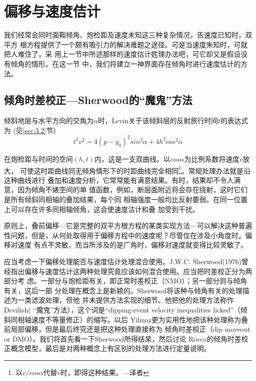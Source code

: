 \section{偏移与速度佶计}
\label{sec:3.6}

我们经常会同时面鞍倾角、炮检距及速度未知这三种复杂情况，告速度已知时，双平方
根方程提供了一个颇有吸引力的解决难题之途径。可是当速度朱知时，可就把人难住了，采
用上一节中所述那样的速度估计姓理办法吧，可它却又是假设没有倾角的情形。在这一节
中，我们将建立一神界面存在倾角时进行速度估计的方法。

\subsection{倾角时差校正---Sherwood的“魔鬼”方法}
\label{sec:3.6.1}

倾斜地层与水平方向的交角为$\alpha$时，Levin关于该倾斜层的反射旅行时间$t$的表达式为
(见\ref{sec:3.2}节）
\begin{equation}
t^2v^2=4(y-y_0)^2sin^2\alpha + 4h^2cos^2\alpha
\label{eq:ex3.6.1}
\end{equation}

在炮检距与时间的空间$(h,t)$内，这是一支双曲线。以$cos\alpha$为比例系数将速度$v$放大，
可使这时距曲线同无倾角情形下的时距曲线完全相同\footnote{
以$v/cos\alpha$代替$v$时，即得这种结果。---译者
}。常规处理办法就是沿这种曲线进行
叠加和速度分析，它常常能有满意结果。有时，结果却不令人满意，因为倾角不婊空间的单
值函数，例如，断层面附近将会存在绕射，这时它们是所有倾斜同相轴的叠加结果，每个同
相轴强度一般均比反射要弱。在同一位置上可以存在许多同相轴倾角，这会使速度沽计和叠
加受到干扰。

原则上，叠前偏移---它是完整的双平方根方程的某类实现方法---可以解决这种普遍
性问题，但是，从何处取得用于偏移方程中的速度呢？尽管仅在涉及小角度时，偏移对速度
有点不灵敏，而当所涉及的是广角时，偏移对速度就变得比较灵敏了。

应当考虑一下偏移处理能否与速度估计处理混合使用。J.W.C. Sherwood(1976)曾
经指出偏移与速度估计这两种处理究竟应该如何混合使用。应当把时差校正分为两部分考
虑。一部分与炮检距有关，即正常时差校正（NMO）；另一部分则与倾角有关，这后一部
分处理在概念上是新颖的。Sherwood将该种与倾角有关的处理描述为一类滤波处理，但他
并未提供方法实现的细节。他把他的处理方法称作Devilish(
“魔鬼”方法），这个词是“dipping-event velocity inequalities licked”（倾斜同相轴速度不等量修正）的缩写。以后
Yilmaz更为实用性地把该种处理称为叠前局部偏移，但是最后终究还是把这种处理直接称为
倾角时差校正（dip moveout or
DMO）。我们将首先看一下Sherwood所得结杲，然后讨论
Rocca的倾角时差校正概念模型，最后是对两种概念上有区别的处理方法进行定量说明。


